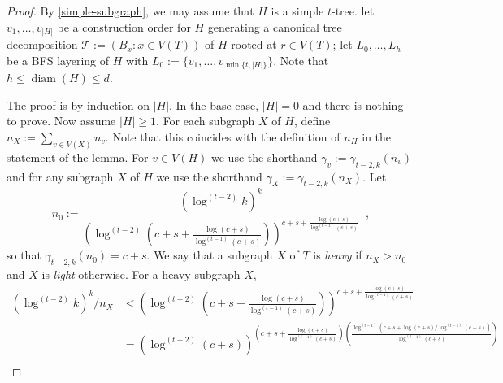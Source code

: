 \documentclass[kpfonts]{patmorin}
\DeclareMathOperator{\diam}{diam}
\theoremstyle{named}
\begin{document}
\begin{proof}

    By \cref{simple-subgraph}, we may assume that $H$ is a simple $t$-tree.   let $v_1,\ldots,v_{|H|}$ be a construction order for $H$ generating a canonical tree decomposition $\mathcal{T}:=(B_x:x\in V(T))$ of $H$ rooted at $r\in V(T)$; let $L_0,\ldots,L_h$ be a BFS layering of $H$ with $L_0:=\{v_1,\ldots,v_{\min\{t,|H|\}}\}$.  Note that $h\le\diam(H)\le d$.

    The proof is by induction on $|H|$.  In the base case, $|H|=0$ and there is nothing to prove.
    Now assume $|H|\ge 1$.  For each subgraph $X$ of $H$, define
    $
        n_{X}:=\sum_{v\in V(X)} n_v
    $.
    Note that this coincides with the definition of $n_H$ in the statement of the lemma.  For $v\in V(H)$ we use the shorthand $\gamma_v:=\gamma_{t-2,k}(n_v)$ and for any subgraph $X$ of $H$ we use the shorthand $\gamma_X := \gamma_{t-2,k}(n_X)$.   Let
    \begin{equation}
        n_0 := \frac{(\log^{(t-2)} k)^k}{\left(\log^{(t-2)}\left(c+s+\tfrac{\log(c+s)}{\log^{(t-1)}(c+s)}\right)\right)^{c+s+\tfrac{\log(c+s)}{\log^{(t-1)}(c+s)}}} \enspace , \label{heavy-def}
    \end{equation}
    so that $\gamma_{t-2,k}(n_0)= c+s$.
    We say that a subgraph $X$ of $T$ is \emph{heavy} if $n_X>n_0$ and $X$ is \emph{light} otherwise.  For a heavy subgraph $X$,
    \begin{align*}
        (\log^{(t-2)} k)^k/n_X & < \left(\log^{(t-2)}\left(c+s+\tfrac{\log(c+s)}{\log^{(t-1)}(c+s)}\right)\right)^{c+s+\tfrac{\log(c+s)}{\log^{(t-1)}(c+s)}} \\
        & = \left(\log^{(t-2)}(c+s)\right)^{\left(c+s+\tfrac{\log(c+s)}{\log^{(t-1)}(c+s)}\right)
            \left(\tfrac{\log^{(t-1)}(c+s+\log(c+s)/\log^{(t-1)}(c+s))}{\log^{(t-1)}(c+s)}\right)} \\

\end{align*}
\end{proof}
\end{document}
